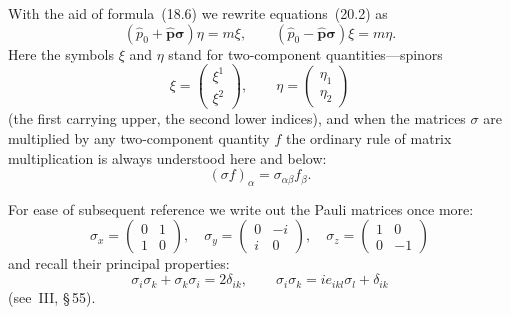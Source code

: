 With the aid of formula~(18.6) we rewrite equations~(20.2) as
\begin{equation}
(\widehat p_0 + \widehat{\mathbf{p}}\boldsymbol{\sigma})\eta = m\xi,\qquad (\widehat p_0 - \widehat{\mathbf{p}}\boldsymbol{\sigma})\xi = m\eta.
\tag{20.5}
\end{equation}
Here the symbols $\xi$ and $\eta$ stand for two-component quantities---spinors
\begin{equation}
\xi = \begin{pmatrix} \xi^1\\ \xi^2 \end{pmatrix},\qquad \eta = \begin{pmatrix} \eta_{\dot 1}\\ \eta_{\dot 2} \end{pmatrix}
\tag{20.6}
\end{equation}
(the first carrying upper, the second lower indices), and when the matrices $\sigma$ are multiplied by any two-component quantity $f$ the ordinary rule of matrix multiplication is always understood here and below:
\begin{equation}
(\sigma f)_\alpha = \sigma_{\alpha\beta}f_\beta.
\tag{20.7}
\end{equation}

For ease of subsequent reference we write out the Pauli matrices once more:
\begin{equation}
\sigma_x = \begin{pmatrix} 0 & 1\\ 1 & 0 \end{pmatrix},\quad
\sigma_y = \begin{pmatrix} 0 & -i\\ i & 0 \end{pmatrix},\quad
\sigma_z = \begin{pmatrix} 1 & 0\\ 0 & -1 \end{pmatrix}
\tag{20.8}
\end{equation}
and recall their principal properties:
\begin{equation}
\sigma_i\sigma_k + \sigma_k\sigma_i = 2\delta_{ik},\qquad \sigma_i\sigma_k = ie_{ikl}\sigma_l + \delta_{ik}
\tag{20.9}
\end{equation}
(see~III, \S\,55).

